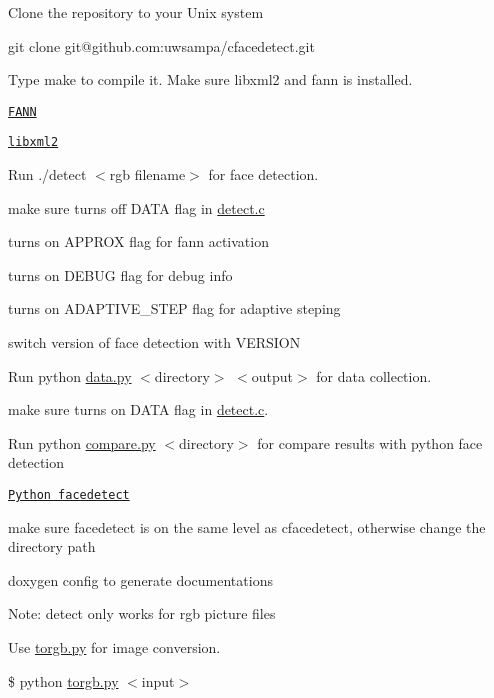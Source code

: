 
\begin{DoxyEnumerate}
\item Clone the repository to your Unix system
\begin{DoxyItemize}
\item {\ttfamily git clone git@github.\+com\+:uwsampa/cfacedetect.\+git}
\end{DoxyItemize}
\item Type {\ttfamily make} to compile it. Make sure libxml2 and fann is installed.
\begin{DoxyItemize}
\item \href{http://leenissen.dk/fann/wp/}{\tt F\+A\+N\+N}
\item \href{http://www.xmlsoft.org/}{\tt libxml2}
\end{DoxyItemize}
\item Run {\ttfamily ./detect $<$rgb filename$>$} for face detection.
\begin{DoxyItemize}
\item make sure turns off D\+A\+T\+A flag in \hyperlink{detect_8c}{detect.\+c}
\item turns on A\+P\+P\+R\+O\+X flag for fann activation
\item turns on D\+E\+B\+U\+G flag for debug info
\item turns on A\+D\+A\+P\+T\+I\+V\+E\+\_\+\+S\+T\+E\+P flag for adaptive steping
\item switch version of face detection with V\+E\+R\+S\+I\+O\+N
\end{DoxyItemize}
\item Run {\ttfamily python \hyperlink{data_8py}{data.\+py} $<$directory$>$ $<$output$>$} for data collection.
\begin{DoxyItemize}
\item make sure turns on D\+A\+T\+A flag in \hyperlink{detect_8c}{detect.\+c}.
\end{DoxyItemize}
\item Run {\ttfamily python \hyperlink{compare_8py}{compare.\+py} $<$directory$>$} for compare results with python face detection
\begin{DoxyItemize}
\item \href{https://github.com/uwsampa/facedetect}{\tt Python facedetect}
\item make sure facedetect is on the same level as cfacedetect, otherwise change the directory path
\end{DoxyItemize}
\item {\ttfamily doxygen config} to generate documentations
\end{DoxyEnumerate}

Note\+: detect only works for rgb picture files

Use \hyperlink{torgb_8py}{torgb.\+py} for image conversion.
\begin{DoxyItemize}
\item {\ttfamily \$ python \hyperlink{torgb_8py}{torgb.\+py} $<$input$>$} 
\end{DoxyItemize}